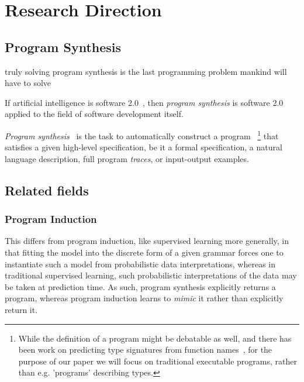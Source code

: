 \documentclass{article}
\begin{document}


\tableofcontents

\pagebreak

\section{Research Direction} %

\subsection{Program Synthesis}

\begin{displayquote}
    truly solving program synthesis is the last programming problem mankind will have to solve~\citep{nps}
\end{displayquote}

\begin{displayquote}
    If artificial intelligence is software 2.0~\citep{software20},
    then \emph{program synthesis} is software 2.0 applied to the field of software development itself.
\end{displayquote}

\emph{Program synthesis}~\citep{church1957applications} is the task to automatically construct a program%
~\footnote{While the definition of a program might be debatable as well, and there has been work on predicting type signatures from function names~\citep{wang2018predicting}, for the purpose of our paper we will focus on traditional executable programs, rather than e.g. 'programs' describing types.}%
that satisfies a given high-level specification,
be it a formal specification, a natural language description, full program \emph{traces}, or input-output examples.

\subsection{Related fields}

\subsubsection{Program Induction}

This differs from program induction, like supervised learning more generally,
in that fitting the model into the discrete form of a given grammar
forces one to instantiate such a model from probabilistic data interpretations,
whereas in traditional supervised learning,
such probabilistic interpretations of the data may be taken at prediction time.
As such, program synthesis explicitly returns a program, whereas program induction learns to \emph{mimic} it rather than explicitly return it.~\citep{nps}
\end{document}
